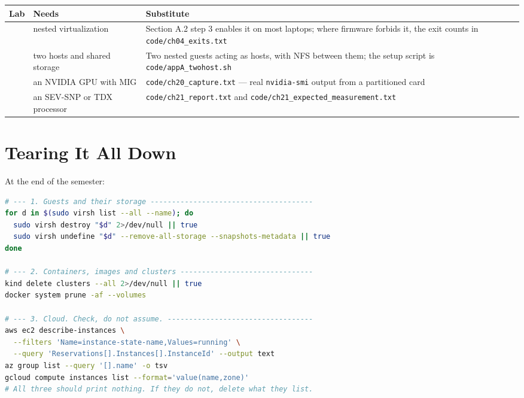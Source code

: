 \begin{longtable}{@{}L{3.0cm}L{4.4cm}L{7.2cm}@{}}
\toprule
{}
\textbf{Lab} & \textbf{Needs} & \textbf{Substitute} \\
\midrule
\endhead
{} & nested virtualization & Section A.2 step 3 enables it on most
laptops; where firmware forbids it, the exit counts in
\texttt{code/ch04\_exits.txt} \\
 & two hosts and shared storage & Two nested guests acting as
hosts, with NFS between them; the setup script is
\texttt{code/appA\_twohost.sh} \\
 & an NVIDIA GPU with MIG & \texttt{code/ch20\_capture.txt} ---
real \texttt{nvidia-smi} output from a partitioned card \\
 & an SEV-SNP or TDX processor &
\texttt{code/ch21\_report.txt} and
\texttt{code/ch21\_expected\_measurement.txt} \\
\bottomrule
\end{longtable}

\section{Tearing It All Down}

At the end of the semester:

\begin{lstlisting}[language=bash]
# --- 1. Guests and their storage --------------------------------------
for d in $(sudo virsh list --all --name); do
  sudo virsh destroy "$d" 2>/dev/null || true
  sudo virsh undefine "$d" --remove-all-storage --snapshots-metadata || true
done

# --- 2. Containers, images and clusters -------------------------------
kind delete clusters --all 2>/dev/null || true
docker system prune -af --volumes

# --- 3. Cloud. Check, do not assume. ----------------------------------
aws ec2 describe-instances \
  --filters 'Name=instance-state-name,Values=running' \
  --query 'Reservations[].Instances[].InstanceId' --output text
az group list --query '[].name' -o tsv
gcloud compute instances list --format='value(name,zone)'
# All three should print nothing. If they do not, delete what they list.
\end{lstlisting}
